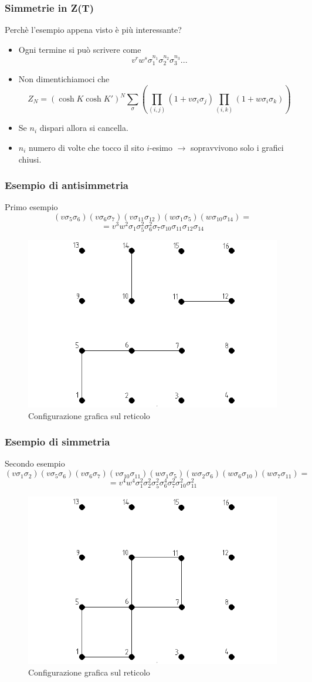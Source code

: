 \documentclass[11pt]{beamer}
\begin{document}
\begin{frame}
\frametitle{Simmetrie in Z(T)}
Perchè l'esempio appena visto è più interessante?\\
\begin{itemize}
\item<1->{Ogni termine si può scrivere come
$$v^rw^s\sigma_1^{n_1}\sigma_2^{n_2}\sigma_3^{n_3}...
$$}
\item<2->{Non dimentichiamoci che
$$Z_N=(\cosh{K}\cosh{K'})^N\sum_{\sigma}\left(\prod_{(i,j)}(1+v\sigma_i\sigma_j)\prod_{(i,k)}(1+w\sigma_i\sigma_k)\right) 
$$}
\item<3->{Se $n_i$ dispari allora si cancella.}
\item<4->{$n_i$ numero di volte che tocco il sito $i$-esimo $\to$ sopravvivono solo i grafici chiusi. }
\end{itemize}
\end{frame}
\begin{frame}
\frametitle{Esempio di antisimmetria}
Primo esempio
$$(v\sigma_{5}\sigma_{6})(v\sigma_{6}\sigma_{7})(v\sigma_{11}\sigma_{12})(w\sigma_{1}\sigma_{5})(w\sigma_{10}\sigma_{14})=
$$
$$
=v^3w^2\sigma_1\sigma_{5}^2\sigma_{6}^2\sigma_{7}\sigma_{10}\sigma_{11}\sigma_{12}\sigma_{14}
$$

\begin{figure}[r]
	\centering
	\includegraphics[width=0.5\columnwidth]{sat21}
	\caption{Configurazione grafica sul reticolo}
	\label{fig1}
	\end{figure}

\end{frame}

\begin{frame}
\frametitle{Esempio di simmetria}
Secondo esempio
$$(v\sigma_{1}\sigma_{2})(v\sigma_{5}\sigma_{6})(v\sigma_{6}\sigma_{7})(v\sigma_{10}\sigma_{11})(w\sigma_{1}\sigma_{5})(w\sigma_{2}\sigma_{6})(w\sigma_{6}\sigma_{10})(w\sigma_{7}\sigma_{11})=
$$
$$
=v^4w^4\sigma_1^2\sigma_{2}^2\sigma_{5}^2\sigma_{6}^4\sigma_{7}^2\sigma_{10}^2\sigma_{11}^2
$$

\begin{figure}[r]
	\centering
	\includegraphics[width=0.5\columnwidth]{sat22}
	\caption{Configurazione grafica sul reticolo}
	\label{fig1}
	\end{figure}

\end{frame}
\end{document}
